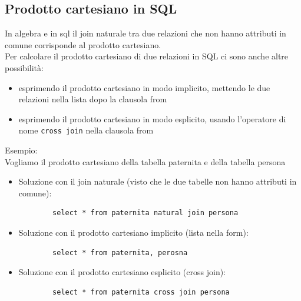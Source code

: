 \subsection{Prodotto cartesiano in SQL}
In algebra e in sql il join naturale tra due relazioni che non hanno attributi in comune corrisponde al prodotto cartesiano.\\
Per calcolare il prodotto cartesiano di due relazioni in SQL ci sono anche altre possibilità:
\begin{itemize}
    \item esprimendo il prodotto cartesiano in modo implicito, mettendo le due relazioni nella lista dopo la clausola from
    \item esprimendo il prodotto cartesiano in modo esplicito, usando l'operatore di nome \texttt{cross join} nella clausola from
\end{itemize}
\textcolor{verdeEsempio}{Esempio:}\\
Vogliamo il prodotto cartesiano della tabella paternita e della tabella persona
\begin{itemize}
    \item Soluzione con il join naturale (visto che le due tabelle non hanno attributi in comune): \begin{verbatim}
        select * from paternita natural join persona        
    \end{verbatim}
    \item Soluzione con il prodotto cartesiano implicito (lista nella form): \begin{verbatim}
        select * from paternita, perosna
    \end{verbatim}
    \item Soluzione con il prodotto cartesiano esplicito (cross join): \begin{verbatim}
        select * from paternita cross join persona
    \end{verbatim}
\end{itemize}

